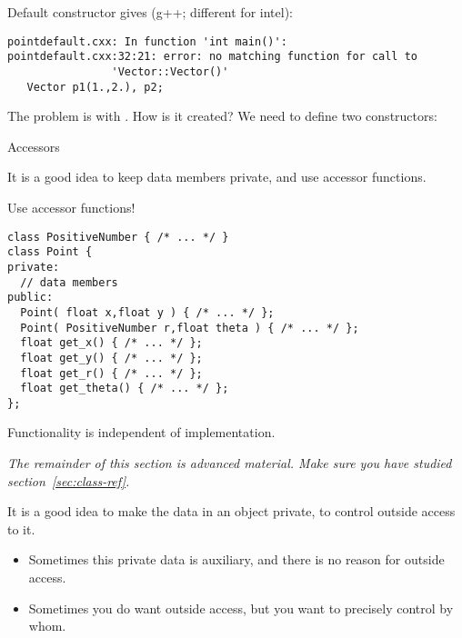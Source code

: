 \begin{slide}{Default constructor}
  \label{sl:obj-def-construct}
\small
  gives (g++; different for intel):
\begin{verbatim}
pointdefault.cxx: In function 'int main()':
pointdefault.cxx:32:21: error: no matching function for call to
                'Vector::Vector()'
   Vector p1(1.,2.), p2;
\end{verbatim}
The problem is with . How is it created? We need to define two constructors:
\end{slide}

 {Accessors}

It is a good idea to keep data members private, and use accessor
functions.

\begin{block}{Use accessor functions!}
  \label{sl:repr-independent}
\begin{verbatim}
class PositiveNumber { /* ... */ }
class Point {
private:
  // data members
public:
  Point( float x,float y ) { /* ... */ };
  Point( PositiveNumber r,float theta ) { /* ... */ };
  float get_x() { /* ... */ };
  float get_y() { /* ... */ };
  float get_r() { /* ... */ };
  float get_theta() { /* ... */ };
};
\end{verbatim}
  Functionality is independent of implementation.
\end{block}

\begin{comment}
  \begin{exercise}
    \label{ex:geom:twoconstruct}
    Write a \n{Point} class that has two constructors:
\begin{verbatim}
class Point {
private:
  // data members
public:
  Point( float x,float y ) { /* ... */ };
  Point( float r,float theta ) { /* ... */ };
  float get_x() { /* ... */ };
  float get_y() { /* ... */ };
  float get_r() { /* ... */ };
  float get_theta() { /* ... */ };
};
\end{verbatim}
Use $r,\theta$ for the private variables, do not store $x,y$.
  \end{exercise}
\end{comment}

\emph{The remainder of this section is advanced material. Make sure
  you have studied section~\ref{sec:class-ref}.}

It is a good idea to make the data in an object private,
to control outside access to it.
\begin{itemize}
\item Sometimes this private data is auxiliary, and there is no reason
  for outside access.
\item Sometimes you do want outside access, but you want to precisely
  control by whom.
\end{itemize}

